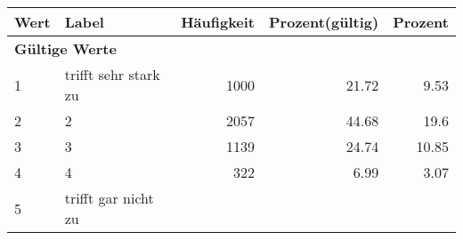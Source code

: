      \begin{longtable}{lXrrr}
     \toprule
     \textbf{Wert} & \textbf{Label} & \textbf{Häufigkeit} & \textbf{Prozent(gültig)} & \textbf{Prozent} \\
     \endhead
     \midrule
     \multicolumn{5}{l}{\textbf{Gültige Werte}}\\

     1 &
     \multicolumn{1}{X}{ trifft sehr stark zu   } &


       \num{1000} &
       \num[round-mode=places,round-precision=2]{21.72} &
         \num[round-mode=places,round-precision=2]{9.53} \\

     2 &
     \multicolumn{1}{X}{ 2   } &


       \num{2057} &
       \num[round-mode=places,round-precision=2]{44.68} &
         \num[round-mode=places,round-precision=2]{19.6} \\

     3 &
     \multicolumn{1}{X}{ 3   } &


       \num{1139} &
       \num[round-mode=places,round-precision=2]{24.74} &
         \num[round-mode=places,round-precision=2]{10.85} \\

     4 &
     \multicolumn{1}{X}{ 4   } &


       \num{322} &
       \num[round-mode=places,round-precision=2]{6.99} &
         \num[round-mode=places,round-precision=2]{3.07} \\

     5 &
     \multicolumn{1}{X}{ trifft gar nicht zu   } &



\end{longtable}
